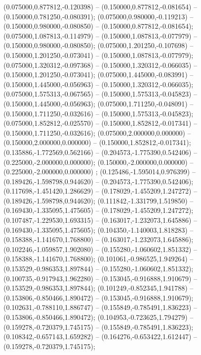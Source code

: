  (0.075000,0.877812,-0.120398) -- (0.150000,0.877812,-0.081654) -- (0.150000,0.781250,-0.080391);
 (0.075000,0.980000,-0.119213) -- (0.150000,0.980000,-0.080850) -- (0.150000,0.877812,-0.081654);
 (0.075000,1.087813,-0.114979) -- (0.150000,1.087813,-0.077979) -- (0.150000,0.980000,-0.080850);
 (0.075000,1.201250,-0.107698) -- (0.150000,1.201250,-0.073041) -- (0.150000,1.087813,-0.077979);
 (0.075000,1.320312,-0.097368) -- (0.150000,1.320312,-0.066035) -- (0.150000,1.201250,-0.073041);
 (0.075000,1.445000,-0.083991) -- (0.150000,1.445000,-0.056963) -- (0.150000,1.320312,-0.066035);
 (0.075000,1.575313,-0.067565) -- (0.150000,1.575313,-0.045823) -- (0.150000,1.445000,-0.056963);
 (0.075000,1.711250,-0.048091) -- (0.150000,1.711250,-0.032616) -- (0.150000,1.575313,-0.045823);
 (0.075000,1.852812,-0.025570) -- (0.150000,1.852812,-0.017341) -- (0.150000,1.711250,-0.032616);
 (0.075000,2.000000,0.000000) -- (0.150000,2.000000,0.000000) -- (0.150000,1.852812,-0.017341);
 (0.135886,-1.772569,0.562166) -- (0.204573,-1.775390,0.542406) -- (0.225000,-2.000000,0.000000);
 (0.150000,-2.000000,0.000000) -- (0.225000,-2.000000,0.000000) ;
 (0.125486,-1.595014,0.976399) -- (0.189426,-1.598798,0.944620) -- (0.204573,-1.775390,0.542406);
 (0.117698,-1.451420,1.286629) -- (0.178029,-1.455209,1.247272) -- (0.189426,-1.598798,0.944620);
 (0.111842,-1.331799,1.519850) -- (0.169430,-1.335095,1.475605) -- (0.178029,-1.455209,1.247272);
 (0.107487,-1.229530,1.693315) -- (0.163017,-1.232073,1.645886) -- (0.169430,-1.335095,1.475605);
 (0.104350,-1.140003,1.818283) -- (0.158388,-1.141670,1.768800) -- (0.163017,-1.232073,1.645886);
 (0.102246,-1.059857,1.902080) -- (0.155280,-1.060602,1.851332) -- (0.158388,-1.141670,1.768800);
 (0.101061,-0.986525,1.949264) -- (0.153529,-0.986353,1.897844) -- (0.155280,-1.060602,1.851332);
 (0.100735,-0.917943,1.962280) -- (0.153045,-0.916888,1.910679) -- (0.153529,-0.986353,1.897844);
 (0.101249,-0.852345,1.941788) -- (0.153806,-0.850466,1.890472) -- (0.153045,-0.916888,1.910679);
 (0.102631,-0.788110,1.886747) -- (0.155849,-0.785491,1.836223) -- (0.153806,-0.850466,1.890472);
 (0.104953,-0.723625,1.794279) -- (0.159278,-0.720379,1.745175) -- (0.155849,-0.785491,1.836223);
 (0.108342,-0.657143,1.659282) -- (0.164276,-0.653422,1.612447) -- (0.159278,-0.720379,1.745175);
